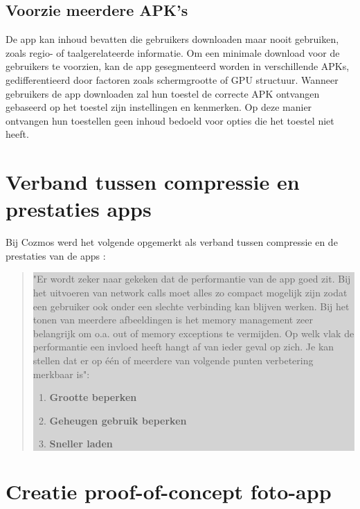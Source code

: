 \subsection{Voorzie meerdere APK's}
\label{sec:multipleapks}
De app kan inhoud bevatten die gebruikers downloaden maar nooit gebruiken, zoals regio- of taalgerelateerde informatie. Om een minimale download voor de gebruikers te voorzien, kan de app gesegmenteerd worden in verschillende APKs, gedifferentieerd door factoren zoals schermgrootte of GPU structuur.
Wanneer gebruikers de app downloaden zal hun toestel de correcte APK ontvangen gebaseerd op het toestel zijn instellingen en kenmerken. Op deze manier ontvangen hun toestellen geen inhoud bedoeld voor opties die het toestel niet heeft.


\section{Verband tussen compressie en prestaties apps}
\label{sec:verbandcompressieprestaties}
Bij Cozmos werd het volgende opgemerkt als verband tussen compressie en de prestaties van de apps :
\begin{quote}
	\colorbox{lightgray}{\parbox{350px}{"Er wordt zeker naar gekeken dat de performantie van de app goed zit. Bij het uitvoeren van network calls moet alles zo compact mogelijk zijn zodat een gebruiker ook onder een slechte verbinding kan blijven werken. Bij het tonen van meerdere afbeeldingen is het memory management zeer belangrijk om o.a. out of memory exceptions te vermijden. Op welk vlak de performantie een invloed heeft hangt af van ieder geval op zich. Je kan stellen dat er op één of meerdere van volgende punten verbetering merkbaar is": \begin{enumerate}
				\item \textbf{Grootte beperken}
				\item \textbf{Geheugen gebruik beperken}
				\item \textbf{Sneller laden}
			\end{enumerate}
	}}
\end{quote}


\section{Creatie proof-of-concept foto-app}
\label{sec:proofofconcept}

